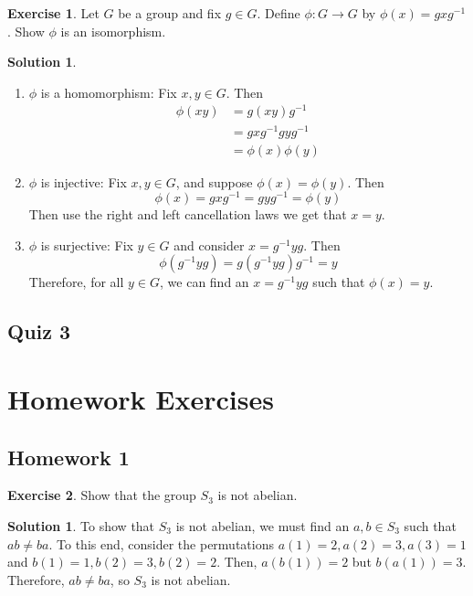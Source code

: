 \documentclass[12pt]{article}
\theoremstyle{definition}
\newtheorem{exercise}{Exercise}
\theoremstyle{definition}
\newtheorem{solution}[theorem]{Solution}
\begin{document}
\begin{exercise}
Let $G$ be a group and fix $g \in G$. Define $\phi : G \to G$ by $\phi(x) = gxg^{-1}$. Show $\phi$ is an isomorphism.
\end{exercise}
\begin{solution}
\begin{enumerate}
	\item $\phi$ is a homomorphism: Fix $x, y \in G$. Then
	\begin{align*}
	\phi(xy) &= g (xy) g^{-1} \\
	&= g x g^{-1} g y g^{-1} \\
	&= \phi(x) \phi(y)
	\end{align*}
	\item $\phi$ is injective: Fix $x, y \in G$, and suppose $\phi(x)=\phi(y)$. Then
	\begin{equation}
		\phi(x) = g x g^{-1} = g y g^{-1} = \phi(y) 
	\end{equation}
	Then use the right and left cancellation laws we get that $x = y$.
	\item $\phi$ is surjective: Fix $y \in G$ and consider $x = g^{-1} y g$. Then
	\begin{equation}
		\phi(g^{-1}yg) = g (g^{-1}yg) g^{-1} = y
	\end{equation}
	Therefore, for all $y \in G$, we can find an $x = g^{-1} y g$ such that $\phi(x) = y$.
\end{enumerate}
\end{solution}

\subsection{Quiz 3}

\section{Homework Exercises}
\subsection{Homework 1}
\begin{exercise}
Show that the group $S_3$ is not abelian. 
\end{exercise}
\begin{solution}
To show that $S_3$ is not abelian, we must find an $a,b \in S_3$ such that $ab \neq ba$. To this end, consider the permutations $a(1) = 2, a(2) = 3, a(3) = 1$ and $b(1) = 1, b(2) = 3, b(2) = 2.$ Then, $a(b(1))= 2$ but $b(a(1)) = 3$. Therefore, $ab \neq ba$, so $S_3$ is not abelian.
\end{solution}
\end{document}
